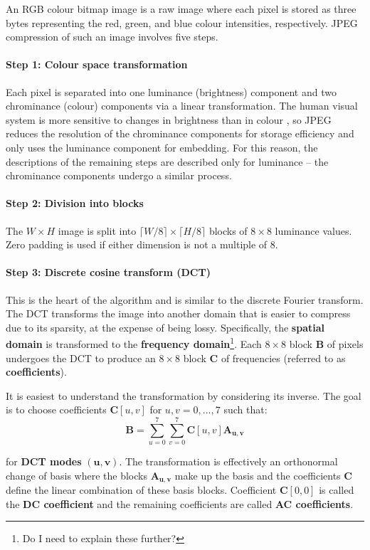 \documentclass[11pt,a4paper,twoside,openright]{report}
\begin{document}
An RGB colour bitmap image is a raw image where each pixel is stored as three bytes representing the red, green, and blue colour intensities, respectively. JPEG compression of such an image involves five steps.

\paragraph{Step 1: Colour space transformation} Each pixel is separated into one luminance (brightness) component and two chrominance (colour) components via a linear transformation. The human visual system is more sensitive to changes in brightness than in colour \cite{textbook}, so JPEG reduces the resolution of the chrominance components for storage efficiency and only uses the luminance component for embedding. For this reason, the descriptions of the remaining steps are described only for luminance -- the chrominance components undergo a similar process.

\paragraph{Step 2: Division into blocks} The $W \times H$ image is split into $\lceil W/8 \rceil \times \lceil H/8 \rceil$ blocks of $8 \times 8$ luminance values. Zero padding is used if either dimension is not a multiple of 8.

\paragraph{Step 3: Discrete cosine transform (DCT)} This is the heart of the algorithm and is similar to the discrete Fourier transform. The DCT transforms the image into another domain that is easier to compress due to its sparsity, at the expense of being lossy. Specifically, the \textbf{spatial domain} is transformed to the \textbf{frequency domain}\footnote{Do I need to explain these further?}. Each $8 \times 8$ block $\bm{B}$ of pixels undergoes the DCT to produce an $8 \times 8$ block $\bm{C}$ of frequencies (referred to as \textbf{coefficients}).

It is easiest to understand the transformation by considering its inverse. The goal is to choose coefficients $\bm{C}[u,v]$ for $u,v = 0,...,7$ such that:
\begin{equation*}
    \bm{B} = \sum_{u=0}^7 \sum_{v=0}^7 \bm{C}[u,v] \bm{A_{u,v}}
\end{equation*}

for \textbf{DCT modes} $\bm{(u,v)}$. The transformation is effectively an orthonormal change of basis where the blocks $\bm{A_{u,v}}$ make up the basis and the coefficients $\bm{C}$ define the linear combination of these basis blocks. Coefficient $\bm{C}[0,0]$ is called the \textbf{DC coefficient} and the remaining coefficients are called \textbf{AC coefficients}.
\end{document}
